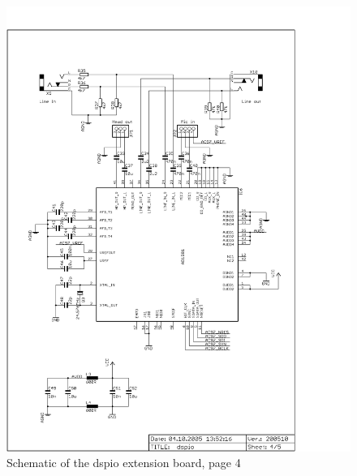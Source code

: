 \begin{figure}
    \centering
    \includegraphics[scale=0.68]{appendix/dspio_p4}
    \caption{Schematic of the dspio extension board, page 4}
\end{figure}

